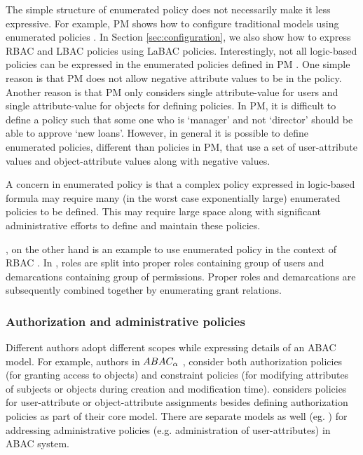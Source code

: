 	The simple structure of enumerated policy does not necessarily make it less expressive. For example, PM shows how to configure traditional models using enumerated policies \cite{INCITS526}. In Section \ref{sec:configuration}, we also show how to express RBAC \cite{rbac} and LBAC \cite{lbac} policies using LaBAC policies. Interestingly, not all logic-based policies can be expressed in the enumerated policies defined in PM . One simple reason is that PM does not allow negative attribute values to be in the policy. Another reason is that PM only considers single attribute-value for users and single attribute-value for objects for defining policies. In PM, it is difficult to define a policy such that some one who is `manager' and not `director' should be able to approve `new loans'. However, in general it is possible to define enumerated policies, different than policies in PM, that use a set of user-attribute values and object-attribute values along with negative values.
	
	A concern in enumerated policy is that a complex policy expressed in logic-based formula may require many (in the worst case exponentially large) enumerated policies  to be defined. This may require large space along with significant administrative efforts to define and maintain these policies.
	
	\twoSortedRBAC{} \cite{two-sorted-rbac},   on the other hand is an example to use enumerated policy in the context of RBAC \cite{rbac}.  In  \twoSortedRBAC{}, roles are split into proper roles containing group of users and demarcations containing group of permissions.  Proper roles and demarcations are subsequently  combined together by enumerating grant relations.

\subsubsection{Authorization and administrative policies}
	Different authors adopt different scopes while expressing details of an ABAC model. For example, authors in $ABAC_\alpha${} \cite{abacAlpha}, consider both authorization policies (for granting access to objects) and constraint policies (for modifying attributes of subjects or objects during creation and modification time). \hgabac{} \cite{hgabac} considers policies for user-attribute or object-attribute assignments besides defining authorization policies as part of their core model. There are separate models as well (eg. \cite{attribute-administration}) for addressing administrative policies (e.g. administration of user-attributes) in ABAC system.
	
